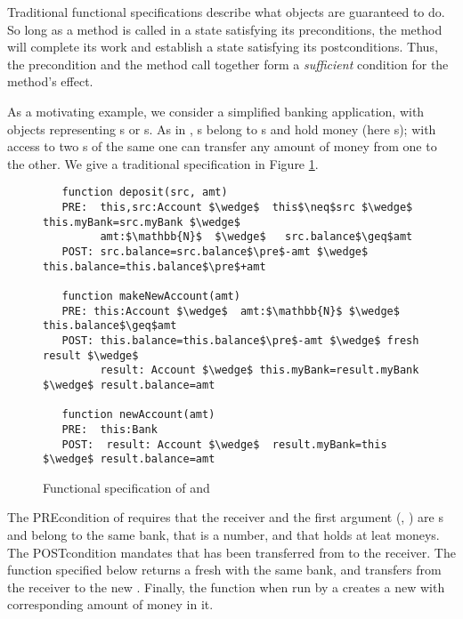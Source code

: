  
Traditional functional specifications describe what objects are
guaranteed to do. 
So long as a method is called in a state satisfying
its preconditions, the method will complete its work and establish a
state satisfying its postconditions.  
Thus, the precondition and the method call together form a \emph{sufficient}
condition for the method's effect.

As a motivating example, we consider a simplified banking application,
with objects representing s or s. 
As in \cite{ELang},   s belong to s and hold money (here s);  
with access  to two s of the same   one can  transfer any amount of money from
 one to the other.  We give a traditional specification in Figure \ref{fig:BankSpec}.

\begin{figure}[htbp] 
\begin{lstlisting}
   function deposit(src, amt)
   PRE:  this,src:Account $\wedge$  this$\neq$src $\wedge$ this.myBank=src.myBank $\wedge$ 
         amt:$\mathbb{N}$  $\wedge$   src.balance$\geq$amt
   POST: src.balance=src.balance$\pre$-amt $\wedge$ this.balance=this.balance$\pre$+amt

   function makeNewAccount(amt)
   PRE: this:Account $\wedge$  amt:$\mathbb{N}$ $\wedge$  this.balance$\geq$amt
   POST: this.balance=this.balance$\pre$-amt $\wedge$ fresh result $\wedge$ 
         result: Account $\wedge$ this.myBank=result.myBank $\wedge$ result.balance=amt

   function newAccount(amt)
   PRE:  this:Bank  
   POST:  result: Account $\wedge$  result.myBank=this $\wedge$ result.balance=amt
 \end{lstlisting}
 \vspace{-.8cm}
\caption{Functional specification of  and }
\label{fig:functionalSpecBankAccount}
\label{fig:BankSpec}
\end{figure} 

The PREcondition of  requires that  the receiver and the first argument  (, ) are s
and belong to the same bank,
that  is a number, and that  holds at leat  moneys.
The POSTcondition mandates that  has been transferred from  to the receiver.
 The function  specified below returns a fresh  with the same bank, and transfers 
 from the receiver  to the new .
 Finally, the function  when run by a  creates a new  with corresponding 
 amount of money in it. 


